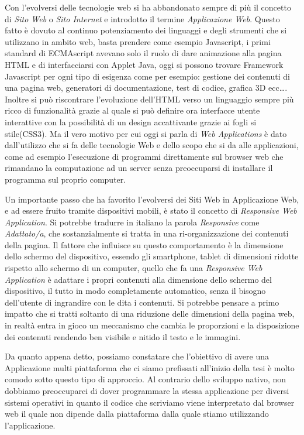 Con l'evolversi delle tecnologie web si ha abbandonato sempre di più il concetto di \emph{Sito Web} o \emph{Sito Internet} e introdotto il termine \emph{Applicazione Web}. Questo fatto è dovuto al continuo potenziamento dei linguaggi e degli strumenti che si utilizzano in ambito web, basta prendere come esempio Javascript, i primi standard di ECMAscript avevano solo il ruolo di dare animazione alla pagina HTML e di interfacciarsi con Applet Java, oggi si possono trovare Framework Javascript per ogni tipo di esigenza come per esempio: gestione dei contenuti di una pagina web, generatori di documentazione, test di codice, grafica 3D ecc\ldots. Inoltre si può riscontrare l'evoluzione dell'HTML verso un linguaggio sempre più ricco di funzionalità grazie al quale si può definire ora interfacce utente interattive con la possibilità di un design accattivante grazie ai fogli si stile(CSS3). Ma il vero motivo per cui oggi si parla di  \emph{Web Applications} è dato dall'utilizzo che si fa delle tecnologie Web e dello scopo che si da alle applicazioni, come ad esempio l'esecuzione di programmi direttamente sul browser web che rimandano la computazione ad un server senza preoccuparsi di installare il programma sul proprio computer.

Un importante passo che ha favorito l’evolversi dei Siti Web in Applicazione Web, e ad essere fruito tramite dispositivi mobili, è stato il concetto di \emph{Responsive Web Application}. Si potrebbe tradurre in italiano la parola \emph{Responsive} come \emph{Adattato/a}, che sostanzialmente si tratta in una ri-organizzazione dei contenuti della pagina. Il fattore che influisce su questo comportamento è la dimensione dello schermo del dispositivo, essendo gli smartphone, tablet di dimensioni ridotte rispetto allo schermo di un computer, quello che fa una \emph{Responsive Web Application} è adattare i propri contenuti alla dimensione dello schermo del dispositivo, il tutto in modo completamente automatico, senza il bisogno dell'utente di ingrandire con le dita i contenuti. Si potrebbe pensare a primo impatto che si tratti soltanto di una riduzione delle dimensioni della pagina web, in realtà entra in gioco un meccanismo che cambia le proporzioni e la disposizione dei contenuti rendendo ben visibile e nitido il testo e le immagini.
   
Da quanto appena detto, possiamo constatare che l'obiettivo di avere una Applicazione multi piattaforma che ci siamo prefissati all'inizio della tesi è molto comodo sotto questo tipo di approccio. Al contrario dello sviluppo nativo, non dobbiamo preoccuparci di dover programmare la stessa applicazione per diversi sistemi operativi in quanto il codice che scriviamo viene interpretato dal browser web il quale non dipende dalla piattaforma dalla quale stiamo utilizzando l'applicazione.

